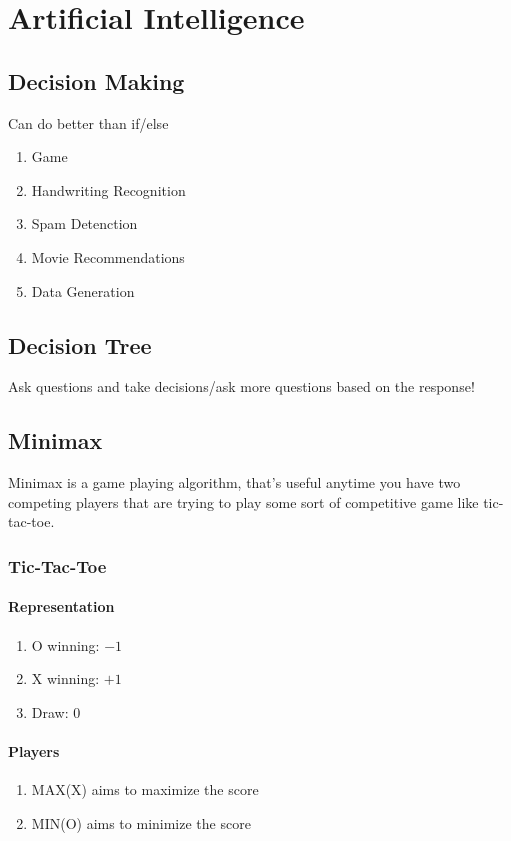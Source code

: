 \chapter{Artificial Intelligence}
\section{Decision Making}
Can do better than if/else
\begin{enumerate}
	\item Game
	\item Handwriting Recognition
	\item Spam Detenction
	\item Movie Recommendations
	\item Data Generation
\end{enumerate}

\section{Decision Tree}
Ask questions and take decisions/ask more questions based on the response!

\section{Minimax}
Minimax is a game playing algorithm, that's useful anytime you have two competing
players that are trying to play some sort of competitive game like tic-tac-toe.

\subsection{Tic-Tac-Toe}
\subsubsection{Representation}
\begin{enumerate}
	\item O winning: $-1$
	\item X winning: $+1$
	\item Draw: $0$
\end{enumerate}

\subsubsection{Players}
\begin{enumerate}
	\item MAX(X) aims to maximize the score
	\item MIN(O) aims to minimize the score
\end{enumerate}


